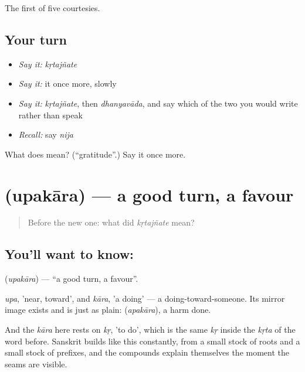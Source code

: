 \begin{grammarlens}[title={What you've built}]
The first of five courtesies.
\end{grammarlens}

\subsection*{Your turn}
\begin{itemize}
\raggedright
  \item \emph{Say it:} \emph{kṛtajñate}
  \item \emph{Say it:} it once more, slowly
  \item \emph{Say it:} \emph{kṛtajñate}, then \emph{dhanyavāda}, and say which of the two you would write rather than speak
  \item \emph{Recall:} say \emph{nija}
\end{itemize}

\begin{tcolorbox}[breakable,colback=teal!4,colframe=teal!35!black,title={Before you move on}]
What does  mean? (\textquotedblleft{}gratitude\textquotedblright{}.) Say it once more.
\end{tcolorbox}
\section[\texorpdfstring{\kn{ಉಪಕಾರ} (upakāra)}{ಉಪಕಾರ (upakāra)}]{ (upakāra) — a good turn, a favour}

\label{lesson:KA-C51-favour}



\begin{quote}
Before the new one: what did \emph{kṛtajñate} mean?
\end{quote}

\subsection*{You'll want to know: }
\textbf{} (\emph{upakāra}) — \textquotedblleft{}a good turn, a favour\textquotedblright{}.

\emph{upa}, 'near, toward', and \emph{kāra}, 'a doing' — a doing-toward-someone. Its mirror image exists and is just as plain:  (\emph{apakāra}), a harm done.

And the \emph{kāra} here rests on \emph{kṛ}, 'to do', which is the same \emph{kṛ} inside the \emph{kṛta} of the word before. Sanskrit builds like this constantly, from a small stock of roots and a small stock of prefixes, and the compounds explain themselves the moment the seams are visible.

